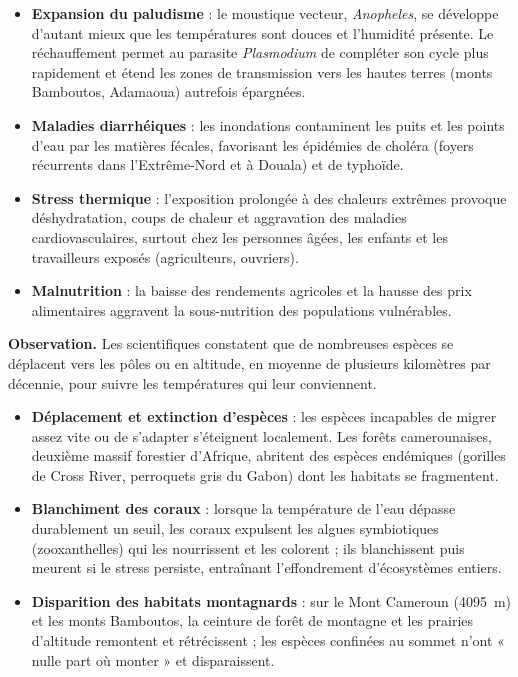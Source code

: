 \documentclass[11pt]{article}
\newcommand{\cle}[1]{{\popxbold\color{popdark}#1}}
\newcounter{popsec}
\newcounter{popsub}
\newcommand{\courssub}[1]{%
  \stepcounter{popsub}%
  \par\vspace{9pt}\noindent{\popxbold\fontsize{11.5}{13}\selectfont\color{popink}{\color{poporange}\thepopsec.\thepopsub}\hspace{6pt}#1}\par\nopagebreak\vspace{4pt}
}
\begin{document}
\begin{itemize}
\item \textbf{Expansion du paludisme} : le moustique vecteur, \emph{Anopheles}, se développe d'autant mieux que les températures sont douces et l'humidité présente. Le réchauffement permet au parasite \emph{Plasmodium} de compléter son cycle plus rapidement et étend les zones de transmission vers les hautes terres (monts Bamboutos, Adamaoua) autrefois épargnées.
\item \textbf{Maladies diarrhéiques} : les inondations contaminent les puits et les points d'eau par les matières fécales, favorisant les épidémies de choléra (foyers récurrents dans l'Extrême-Nord et à Douala) et de typhoïde.
\item \textbf{Stress thermique} : l'exposition prolongée à des chaleurs extrêmes provoque déshydratation, coups de chaleur et aggravation des maladies cardiovasculaires, surtout chez les personnes âgées, les enfants et les travailleurs exposés (agriculteurs, ouvriers).
\item \textbf{Malnutrition} : la baisse des rendements agricoles et la hausse des prix alimentaires aggravent la sous-nutrition des populations vulnérables.
\end{itemize}

\courssub{Perte de biodiversité}

\textbf{Observation.} Les scientifiques constatent que de nombreuses espèces se déplacent vers les pôles ou en altitude, en moyenne de plusieurs kilomètres par décennie, pour suivre les températures qui leur conviennent.

\begin{itemize}
\item \textbf{Déplacement et extinction d'espèces} : les espèces incapables de migrer assez vite ou de s'adapter s'éteignent localement. Les forêts camerounaises, deuxième massif forestier d'Afrique, abritent des espèces endémiques (gorilles de Cross River, perroquets gris du Gabon) dont les habitats se fragmentent.
\item \textbf{Blanchiment des coraux} : lorsque la température de l'eau dépasse durablement un seuil, les coraux expulsent les algues symbiotiques (\cle{zooxanthelles}) qui les nourrissent et les colorent ; ils blanchissent puis meurent si le stress persiste, entraînant l'effondrement d'écosystèmes entiers.
\item \textbf{Disparition des habitats montagnards} : sur le Mont Cameroun (\SI{4095}{\meter}) et les monts Bamboutos, la ceinture de forêt de montagne et les prairies d'altitude remontent et rétrécissent ; les espèces confinées au sommet n'ont « nulle part où monter » et disparaissent.
\end{itemize}
\end{document}
